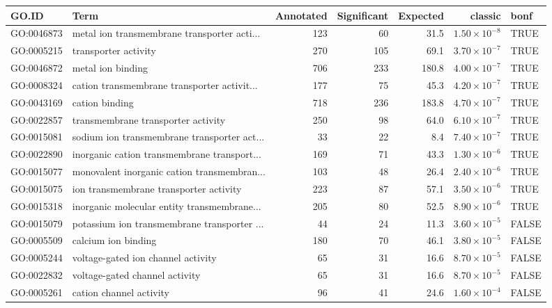 \begin{table}[ht]
\centering
\begin{adjustbox}{max width=\textwidth}
\begin{tabular}{llrrrrl}
  \hline
GO.ID & Term & Annotated & Significant & Expected & classic & bonf \\ 
  \hline
GO:0046873 & metal ion transmembrane transporter acti... & 123 & 60 & 31.5 & $1.50 \times 10^{-8}$ & TRUE \\ 
  GO:0005215 & transporter activity & 270 & 105 & 69.1 & $3.70 \times 10^{-7}$ & TRUE \\ 
  GO:0046872 & metal ion binding & 706 & 233 & 180.8 & $4.00 \times 10^{-7}$ & TRUE \\ 
  GO:0008324 & cation transmembrane transporter activit... & 177 & 75 & 45.3 & $4.20 \times 10^{-7}$ & TRUE \\ 
  GO:0043169 & cation binding & 718 & 236 & 183.8 & $4.70 \times 10^{-7}$ & TRUE \\ 
  GO:0022857 & transmembrane transporter activity & 250 & 98 & 64.0 & $6.10 \times 10^{-7}$ & TRUE \\ 
  GO:0015081 & sodium ion transmembrane transporter act... & 33 & 22 & 8.4 & $7.40 \times 10^{-7}$ & TRUE \\ 
  GO:0022890 & inorganic cation transmembrane transport... & 169 & 71 & 43.3 & $1.30 \times 10^{-6}$ & TRUE \\ 
  GO:0015077 & monovalent inorganic cation transmembran... & 103 & 48 & 26.4 & $2.40 \times 10^{-6}$ & TRUE \\ 
  GO:0015075 & ion transmembrane transporter activity & 223 & 87 & 57.1 & $3.50 \times 10^{-6}$ & TRUE \\ 
  GO:0015318 & inorganic molecular entity transmembrane... & 205 & 80 & 52.5 & $8.90 \times 10^{-6}$ & TRUE \\ 
  GO:0015079 & potassium ion transmembrane transporter ... & 44 & 24 & 11.3 & $3.60 \times 10^{-5}$ & FALSE \\ 
  GO:0005509 & calcium ion binding & 180 & 70 & 46.1 & $3.80 \times 10^{-5}$ & FALSE \\ 
  GO:0005244 & voltage-gated ion channel activity & 65 & 31 & 16.6 & $8.70 \times 10^{-5}$ & FALSE \\ 
  GO:0022832 & voltage-gated channel activity & 65 & 31 & 16.6 & $8.70 \times 10^{-5}$ & FALSE \\ 
  GO:0005261 & cation channel activity & 96 & 41 & 24.6 & $1.60 \times 10^{-4}$ & FALSE \\ 

\end{tabular}
\end{adjustbox}
\end{table}
